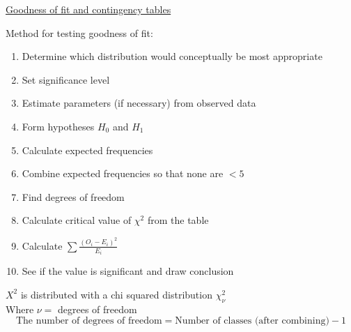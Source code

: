 \documentclass{article}[18pt]
\begin{document}
\begin{center}
\underline{\huge Goodness of fit and contingency tables}
\end{center}
Method for testing goodness of fit:
\begin{enumerate}
\item Determine which distribution would conceptually be most appropriate
\item Set significance level
\item Estimate parameters (if necessary) from observed data
\item Form hypotheses $H_0$ and $H_1$
\item Calculate expected frequencies
\item Combine expected frequencies so that none are $<5$
\item Find degrees of freedom
\item Calculate critical value of $\chi^2$ from the table
\item Calculate $\sum\frac{(O_i-E_i)^2}{E_i}$
\item See if the value is significant and draw conclusion
\end{enumerate}
$X^2$ is distributed with a chi squared distribution $\chi^2_\nu$\\
Where $\nu=$ degrees of freedom\\
$$\textrm{The number of degrees of freedom}=\textrm{Number of classes (after combining)}-1$$
\newpage
\end{document}
